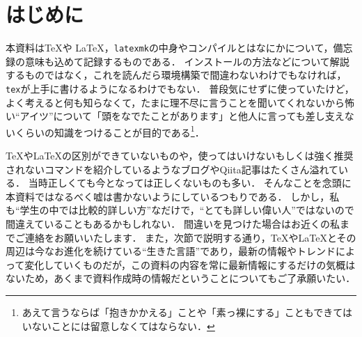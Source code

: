 \documentclass[./main]{subfiles}
\begin{document}
\section{はじめに}
\noindent
本資料は\TeX や \LaTeX ，\verb|latexmk|の中身やコンパイルとはなにかについて，備忘録の意味も込めて記録するものである．
インストールの方法などについて解説するものではなく，これを読んだら環境構築で間違わないわけでもなければ，\verb|tex|が上手に書けるようになるわけでもない．
普段気にせずに使っていたけど，よく考えると何も知らなくて，たまに理不尽に言うことを聞いてくれないから怖い``アイツ''について「頭をなでたことがあります」と他人に言っても差し支えないくらいの知識をつけることが目的である\footnote{あえて言うならば「抱きかかえる」ことや「素っ裸にする」こともできてはいないことには留意しなくてはならない．}．

\TeX や\LaTeX の区別ができていないものや，使ってはいけないもしくは強く推奨されないコマンドを紹介しているようなブログやQiita記事はたくさん溢れている．
当時正しくても今となっては正しくないものも多い．
そんなことを念頭に本資料ではなるべく嘘は書かないようにしているつもりである．
しかし，私も``学生の中では比較的詳しい方''なだけで，``とても詳しい偉い人''ではないので間違えていることもあるかもしれない．
間違いを見つけた場合はお近くの私までご連絡をお願いいたします．
また，次節で説明する通り，\TeX や\LaTeX とその周辺は今なお進化を続けている``生きた言語''であり，最新の情報やトレンドによって変化していくものだが，この資料の内容を常に最新情報にするだけの気概はないため，あくまで資料作成時の情報だということについてもご了承願いたい．


\ifSubfilesClassLoaded{%
  \printbibliography
}{}
\end{document}
